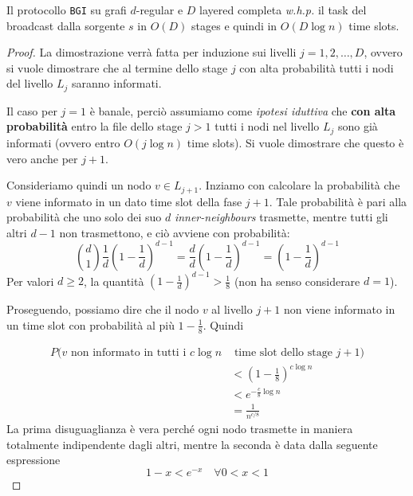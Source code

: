 \begin{teorema}
    Il protocollo \texttt{BGI} su grafi $d$-regular e $D$ layered completa \textit{w.h.p.} il task del broadcast dalla sorgente $s$ in $O(D)$ stages e quindi in $O(D \log n)$ time slots.
    \begin{proof}
        La dimostrazione verrà fatta per induzione sui livelli $j = 1, 2, \dots, D$, ovvero si vuole dimostrare che al termine dello stage $j$ con alta probabilità tutti i nodi del livello $L_j$ saranno informati.

        Il caso per $j = 1$ è banale, perciò assumiamo come \textit{ipotesi iduttiva} che \textbf{con alta probabilità} entro la file dello stage $j > 1$ tutti i nodi nel livello $L_j$ sono già informati (ovvero entro $O(j \log n)$ time slots). Si vuole dimostrare che questo è vero anche per $j + 1$.

        Consideriamo quindi un nodo $v \in L_{j+1}$. Inziamo con calcolare la probabilità che $v$ viene informato in un dato time slot della fase $j+1$. Tale probabilità è pari alla probabilità che uno solo dei suo $d$ \textit{inner-neighbours} trasmette, mentre tutti gli altri $d-1$ non trasmettono, e ciò avviene con probabilità:
        \[
            \binom{d}{1}\frac{1}{d}\left(1 - \frac{1}{d}\right)^{d-1} = \frac{d}{d}\left(1 - \frac{1}{d}\right)^{d-1} = \left(1 - \frac{1}{d}\right)^{d-1}
        \]
        Per valori $d \geq 2$, la quantità $\left(1 - \frac{1}{d}\right)^{d-1} > \frac{1}{8}$ (non ha senso considerare $d = 1$).

        Proseguendo, possiamo dire che il nodo $v$ al livello $j + 1$ non viene informato in un time slot con probabilità al più $1 - \frac{1}{8}$. Quindi

        \begin{align*}
            P(v \text{ non informato in tutti i } c\log n  &\text{ time slot dello stage } j+1) \\
            &< \left(1 - \frac{1}{8}\right)^{c\log n} \\
            &< e^{-\frac{c}{8} \log n} \\
            &= \frac{1}{n^{c/8}}
        \end{align*}
        La prima disuguaglianza è vera perché ogni nodo trasmette in maniera totalmente indipendente dagli altri, mentre la seconda è data dalla seguente espressione
        \[
            1 - x < e^{-x} \quad \forall 0 < x < 1
        \]


\end{proof}
\end{teorema}
